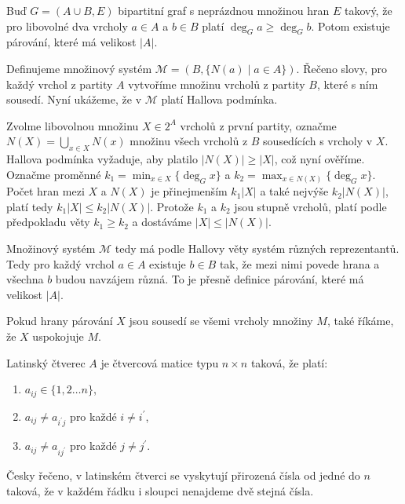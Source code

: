 \begin{t_corollary}
  Buď $G=(A\cup B,E)$ bipartitní graf s neprázdnou množinou hran $E$ takový, že pro libovolné dva vrcholy $a\in A$ a $b\in B$ platí $\deg_G a\geq \deg_G b$. Potom existuje párování, které má velikost $|A|$. 
\end{t_corollary}

\begin{t_proof}
  Definujeme množinový systém $\mathcal{M}=(B,\{N(a)\mid a\in A\})$. Řečeno slovy, pro každý vrchol z partity $A$ vytvoříme množinu vrcholů z partity $B$, které s ním sousedí. Nyní ukážeme, že v $\mathcal{M}$ platí Hallova podmínka.
  
  Zvolme libovolnou množinu $X\in 2^A$ vrcholů z první partity, označme $N(X)=\bigcup_{x\in X}N(x)$ množinu všech vrcholů z $B$ sousedících s vrcholy v $X$. Hallova podmínka vyžaduje, aby platilo $|N(X)|\geq |X|$, což nyní ověříme. Označme proměnné $k_1=\min_{x\in X}\{\deg_G x\}$ a $k_2=\max_{x\in N(X)}\{\deg_G x\}$. Počet hran mezi $X$ a $N(X)$ je přinejmenším $k_1|X|$ a také nejvýše $k_2|N(X)|$, platí tedy $k_1|X|\leq k_2|N(X)|$. Protože $k_1$ a $k_2$ jsou stupně vrcholů, platí podle předpokladu věty $k_1\geq k_2$ a dostáváme $|X|\leq |N(X)|$.
  
  Množinový systém $\mathcal{M}$ tedy má podle Hallovy věty systém různých reprezentantů. Tedy pro každý vrchol $a\in A$ existuje $b\in B$ tak, že mezi nimi povede hrana a všechna $b$ budou navzájem různá. To je přesně definice párování, které má velikost $|A|$.
\end{t_proof}

\begin{t_remark}
  Pokud hrany párování $X$ jsou sousedí se všemi vrcholy množiny $M$, také říkáme, že $X$ uspokojuje $M$.
\end{t_remark}

\begin{t_definition}
  Latinský čtverec $A$ je čtvercová matice typu $n\times n$ taková, že platí:
  \begin{enumerate}
    \item $a_{ij}\in\{1,2\dots n\}$,
    \item $a_{ij}\neq a_{i^\prime j}$ pro každé $i\neq i^\prime$,
    \item $a_{ij}\neq a_{ij^\prime}$ pro každé $j\neq j^\prime$.
  \end{enumerate}
\end{t_definition}

\begin{t_remark}
  Česky řečeno, v latinském čtverci se vyskytují přirozená čísla od jedné do $n$ taková, že v každém řádku i sloupci nenajdeme dvě stejná čísla.
\end{t_remark}

